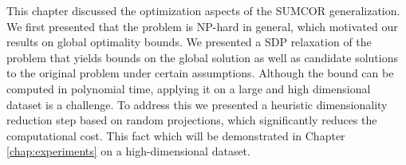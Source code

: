This chapter discussed the optimization aspects of the SUMCOR generalization. We first presented that the problem is NP-hard in general, which
motivated our results on global optimality bounds. We presented a SDP relaxation of the problem that yields bounds on the global solution
as well as candidate solutions to the original problem under certain assumptions. Although the bound can be computed in polynomial time, 
applying it on a large and high dimensional dataset is a challenge. To address this we presented a heuristic dimensionality reduction
step based on random projections, which significantly reduces the computational cost. This fact which will be demonstrated in Chapter \ref{chap:experiments}
on a high-dimensional dataset.
